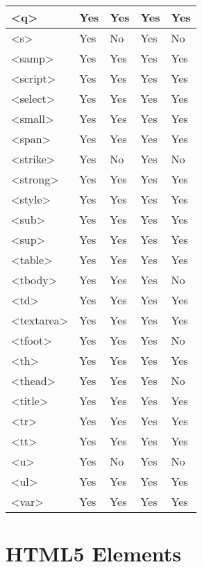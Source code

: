 \begin{longtable}{|p{70pt}|p{70pt}|p{70pt}|p{70pt}|p{70pt}|}
\hline
<q>					&Yes			&Yes	&Yes				&Yes	\\
\hline
<s>					&Yes			&No		&Yes				&No		\\
\hline
<samp>				&Yes			&Yes	&Yes				&Yes	\\
\hline
<script>				&Yes			&Yes	&Yes				&Yes	\\
\hline
<select>				&Yes			&Yes	&Yes				&Yes	\\
\hline
<small>				&Yes			&Yes	&Yes				&Yes	\\
\hline
<span>				&Yes			&Yes	&Yes				&Yes	\\
\hline
<strike>				&Yes			&No		&Yes				&No		\\
\hline
<strong>				&Yes			&Yes	&Yes				&Yes	\\
\hline
<style>				&Yes			&Yes	&Yes				&Yes	\\
\hline
<sub>				&Yes			&Yes	&Yes				&Yes	\\
\hline
<sup>				&Yes			&Yes	&Yes				&Yes	\\
\hline
<table>				&Yes			&Yes	&Yes				&Yes	\\
\hline
<tbody>				&Yes			&Yes	&Yes				&No		\\
\hline
<td>					&Yes			&Yes	&Yes				&Yes	\\
\hline
<textarea>			&Yes			&Yes	&Yes				&Yes	\\
\hline
<tfoot>				&Yes			&Yes	&Yes				&No		\\
\hline
<th>					&Yes			&Yes	&Yes				&Yes	\\
\hline
<thead>				&Yes			&Yes	&Yes				&No		\\
\hline
<title>				&Yes			&Yes	&Yes				&Yes	\\
\hline
<tr>					&Yes			&Yes	&Yes				&Yes	\\
\hline
<tt>					&Yes			&Yes	&Yes				&Yes	\\
\hline
<u>					&Yes			&No		&Yes				&No		\\
\hline
<ul>					&Yes			&Yes	&Yes				&Yes	\\
\hline
<var>				&Yes			&Yes	&Yes				&Yes	\\
\hline
\end{longtable}


\section{HTML5 Elements}


